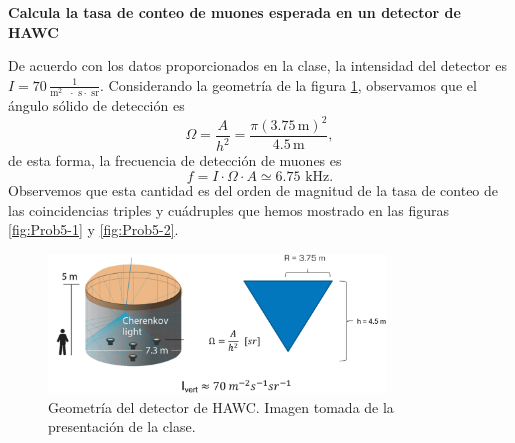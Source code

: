 \documentclass[11pt]{article}
\begin{document}
\textbf{Calcula la tasa de conteo de muones esperada en un detector de HAWC}

De acuerdo con los datos proporcionados en la clase, la intensidad del detector es $I=70\, \frac{1}{\textrm{m$^2$ $\cdot$ s$\cdot$ sr}}$. Considerando la geometría de la figura \ref{fig:detector}, observamos que el ángulo sólido de detección es \begin{equation}
\Omega = \frac{A}{h^2} = \frac{\pi (3.75\,\textrm{m})^2}{4.5\,\textrm{m}},
\end{equation}de esta forma, la frecuencia de detección de muones es \begin{equation}
f = I\cdot \Omega\cdot A \simeq 6.75\textrm{ kHz}.
\end{equation}Observemos que esta cantidad es del orden de magnitud de la tasa de conteo de las coincidencias triples y cuádruples que hemos mostrado en las figuras \ref{fig:Prob5-1} y \ref{fig:Prob5-2}.

\begin{figure}[H]
\centering
\includegraphics[width=0.8\textwidth]{../Figuras/detector.png}
\caption{Geometría del detector de HAWC. Imagen tomada de la presentación de la clase.}
\label{fig:detector}
\end{figure}
\end{document}
